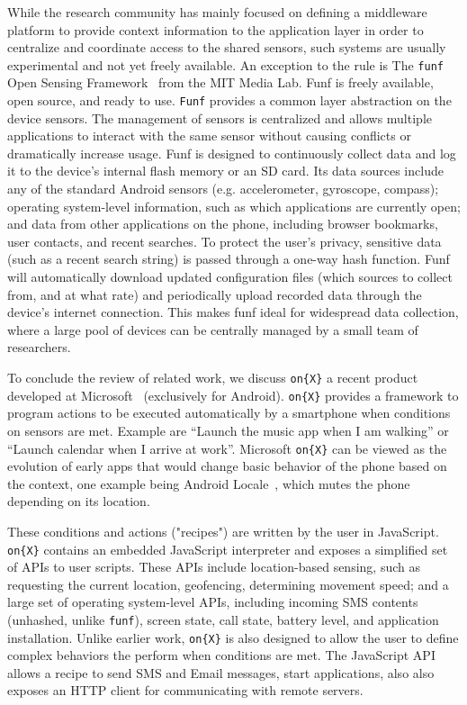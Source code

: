 \documentclass{acm_proc_article-sp}
\begin{document}
While the research community has mainly focused on defining a middleware platform to provide context information to the application layer in order to centralize and coordinate access to the shared sensors, such systems are usually experimental and not yet freely available.
An exception to the rule is The {\tt funf} Open Sensing Framework~\cite{funf}  from the MIT Media Lab. Funf is freely available, open source, and ready to use. {\tt Funf} provides a common layer abstraction on the device sensors. The management of sensors is centralized and allows multiple applications to interact with the same sensor without causing conflicts or dramatically increase usage. Funf is designed to continuously collect data and log it to the device's internal flash memory or an SD card. Its data sources include any of the standard Android sensors (e.g. accelerometer, gyroscope, compass); operating system-level information, such as which applications are currently open; and data from other applications on the phone, including browser bookmarks, user contacts, and recent searches. To protect the user's privacy, sensitive data (such as a recent search string) is passed through a one-way hash function. Funf will automatically download updated configuration files (which sources to collect from, and at what rate) and periodically upload recorded data through the device's internet connection. This makes funf ideal for widespread data collection, where a large pool of devices can be centrally managed by a small team of researchers.

To conclude the review of related work, we discuss {\tt on\{X\}} a recent product developed at Microsoft~\cite{onx} (exclusively for Android). {\tt on\{X\}} provides a framework to program actions to be executed automatically by a smartphone when conditions on sensors are met. Example are ``Launch the music app when I am walking'' or ``Launch calendar when I arrive at work''. Microsoft {\tt on\{X\}} can be viewed as the evolution of early apps that would change basic behavior of the phone based on the context, one example being Android Locale~\cite{android:locale}, which mutes the phone depending on its location. 

These conditions and actions ("recipes") are written by the user in JavaScript. {\tt on\{X\}} contains an embedded JavaScript interpreter and exposes a simplified set of APIs to user scripts. These APIs include location-based sensing, such as requesting the current location, geofencing, determining movement speed; and a large set of operating system-level APIs, including incoming SMS contents (unhashed, unlike {\tt funf}), screen state, call state, battery level, and application installation. Unlike earlier work, {\tt on\{X\}} is also designed to allow the user to define complex behaviors the perform when conditions are met. The JavaScript API allows a recipe to send SMS and Email messages, start applications, also also exposes an HTTP client for communicating with remote servers.
\end{document}
